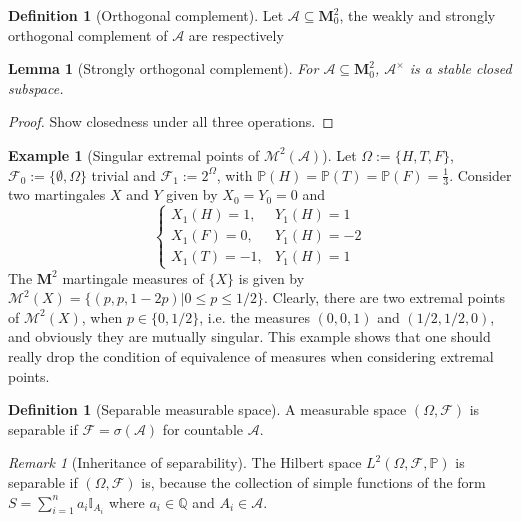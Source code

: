 \documentclass[openany,oneside]{book}
\newtheorem{lem}[thm]{Lemma}
\theoremstyle{definition}
\newtheorem{defn}[thm]{Definition}
\newtheorem{eg}[thm]{Example}
\theoremstyle{remark}
\newtheorem{rem}[thm]{Remark}
\renewcommand{\P}{\mathbb{P}} %
\newcommand{\I}{\mathbb{I}} %
\begin{document}
\begin{defn}[Orthogonal complement]
Let $\mathcal{A} \subseteq \mathbf{M}^2_0$, the weakly and strongly orthogonal complement of $\mathcal{A}$ are respectively 
\end{defn}

\begin{lem}[Strongly orthogonal complement]
For $\mathcal{A} \subseteq \mathbf{M}^2_0$, $\mathcal{A}^\times$ is a stable closed subspace.
\end{lem}
\begin{proof}
Show closedness under all three operations.
\end{proof}



\begin{eg}[Singular extremal points of $\mathcal{M}^2(\mathcal{A})$]
Let $\Omega:=\{H,T,F\}$, $\mathcal{F}_0:=\{\emptyset,\Omega\}$ trivial and $\mathcal{F}_1:=2^\Omega$, with $\P(H)=\P(T)=\P(F)=\frac{1}{3}$. Consider two martingales $X$ and $Y$ given by $X_0=Y_0=0$ and
$$\begin{cases}
X_1(H) = 1, & Y_1(H) = 1 \\
X_1(F) = 0, & Y_1(H) = -2 \\
X_1(T) = -1, & Y_1(H) = 1
\end{cases}$$
The $\mathbf{M}^2$ martingale measures of $\{X\}$ is given by $\mathcal{M}^2(X)=\{(p,p,1-2p) \big\vert 0\le p \le 1/2\}$. Clearly, there are two extremal points of $\mathcal{M}^2(X)$, when $p\in\{0,1/2\}$, i.e. the measures $(0,0,1)$ and $(1/2,1/2,0)$, and obviously they are mutually singular. This example shows that one should really drop the condition of equivalence of measures when considering extremal points.
\end{eg}


\begin{defn}[Separable measurable space]
A measurable space $(\Omega,\mathcal{F})$ is separable if $\mathcal{F}=\sigma(\mathcal{A})$ for countable $\mathcal{A}$.
\end{defn}
\begin{rem}[Inheritance of separability]
The Hilbert space $L^2(\Omega,\mathcal{F},\P)$ is separable if $(\Omega,\mathcal{F})$ is, because the collection of simple functions of the form $S=\sum_{i=1}^n a_i \I_{A_i}$ where $a_i\in\mathbb{Q}$ and $A_i\in\mathcal{A}$.
\end{rem}
\end{document}
